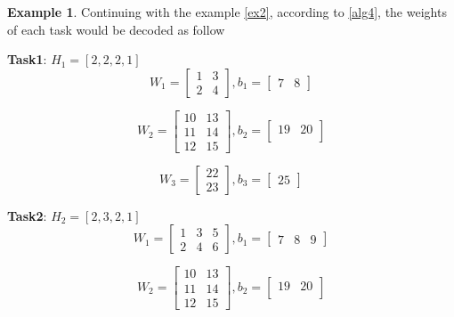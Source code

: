 \documentclass[conference]{IEEEtran}
\theoremstyle{definition}
\newtheorem{example}{Example}[section]
\begin{document}
  \begin{example}
    Continuing with the example \ref{ex2}, according to \ref{alg4}, the weights of each task would be decoded as follow

    \textbf{Task1}: $H_1 = [2, 2, 2, 1]$
    \begin{equation}
      W_1=
      \begin{bmatrix}
        1& 3\\
        2& 4
      \end{bmatrix},
      b_1=
      \begin{bmatrix}
        7& 8
      \end{bmatrix}
    \end{equation}

    \begin{equation}
      W_2=
      \begin{bmatrix}
        10& 13\\
        11& 14\\
        12& 15
      \end{bmatrix},
      b_2=
      \begin{bmatrix}
        19& 20\\
      \end{bmatrix}
    \end{equation}


    \begin{equation}
      W_3=
      \begin{bmatrix}
        22\\
        23
      \end{bmatrix},
      b_3=
      \begin{bmatrix}
        25
      \end{bmatrix}
    \end{equation}


    \textbf{Task2}: $H_2 = [2, 3, 2, 1]$
    \begin{equation}
      W_1=
      \begin{bmatrix}
        1& 3& 5\\
        2& 4& 6
      \end{bmatrix},
      b_1=
      \begin{bmatrix}
        7& 8& 9
      \end{bmatrix}
    \end{equation}

    \begin{equation}
      W_2=
      \begin{bmatrix}
        10& 13\\
        11& 14\\
        12& 15
      \end{bmatrix},
      b_2=
      \begin{bmatrix}
        19& 20\\
      \end{bmatrix}
    \end{equation}



\end{example}
\end{document}
